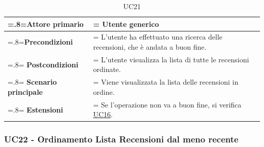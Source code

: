             \begin{table}[H]
                \centering
                \renewcommand{\arraystretch}{1.8}
                \renewcommand\tabularxcolumn[1]{m{#1}}
                \begin{tabularx}{0.9\textwidth} {
                    >{\hsize=.8\hsize\linewidth=\hsize}X
                    >{\hsize=1.2\hsize\linewidth=\hsize}X}
                    \hline
                    \textbf{Attore primario} & Utente generico \\
                    \hline
                    \textbf{Precondizioni} & L'utente ha effettuato una ricerca delle recensioni, che è andata a buon fine. \\
                    \hline
                    \textbf{Postcondizioni} & L'utente visualizza la lista di tutte le recensioni ordinate. \\
                    \hline
                    \textbf{Scenario principale} & Viene visualizzata la lista delle recensioni in ordine. \\
                    \hline
                    \textbf{Estensioni} & Se l'operazione non va a buon fine, si verifica \hyperref[UC16]{UC16}. \\
                    \hline
                \end{tabularx}
                \caption{UC21}
            \end{table}

        \subsubsection{UC22 - Ordinamento Lista Recensioni dal meno recente}
        \label{UC22}

